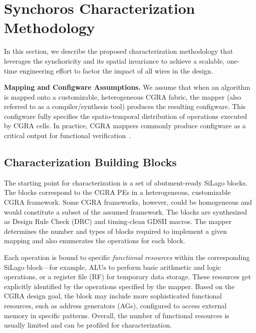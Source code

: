 \section{Synchoros Characterization Methodology}
In this section, we describe the proposed characterization methodology that leverages the synchoricity and its spatial invariance to achieve a scalable, one-time engineering effort to factor the impact of all wires in the design.

\textbf{Mapping and Configware Assumptions.} 
We assume that when an algorithm is mapped onto a customizable, heterogeneous CGRA fabric, the mapper (also referred to as a compiler/synthesis tool) produces the resulting configware.
This configware fully specifies the spatio-temporal distribution of operations executed by CGRA cells.
In practice, CGRA mappers commonly produce configware as a critical output for functional verification~\cite{ragheb2024cgra,wijerathne2022morpher, gobieski2021snafu, yang2022vesyla}. 

\subsection{Characterization Building Blocks}
The starting point for characterization is a set of abutment-ready SiLago blocks.
The blocks correspond to the CGRA PEs in a heterogeneous, customizable CGRA framework. 
Some CGRA frameworks, however, could be homogeneous and would constitute a subset of the assumed framework.
The blocks are synthesized as Design Rule Check (DRC) and timing-clean GDSII macros. 
The mapper determines the number and types of blocks required to implement a given mapping and also enumerates the operations for each block.

Each operation is bound to specific \textit{functional resources} within the corresponding SiLago block—for example,
ALUs to perform basic arithmetic and logic operations, or a register file (RF) for temporary data storage.
These resources get explicitly identified by the operations specified by the mapper.
Based on the CGRA design goal, the block may include more sophisticated functional resources, such as address generators (AGs), configured to access external memory in specific patterns. 
Overall, the number of functional resources is usually limited and can be profiled for characterization.

